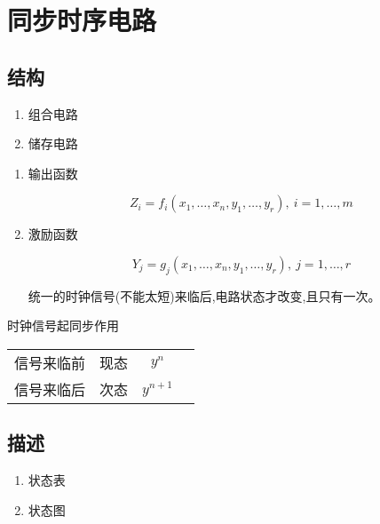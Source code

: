 \chapter{同步时序电路}
\newpage

\section{结构}

\begin{enumerate}

    \item 组合电路
    \item 储存电路

\end{enumerate}

\begin{enumerate}

\item 输出函数

\begin{equation}
    Z_i=f_i(x_1,\dots,x_n,y_1,\dots,y_r),~i=1,\dots,m
\end{equation}

\item 激励函数

\begin{equation}
    Y_j=g_j(x_1,\dots,x_n,y_1,\dots,y_r),~j=1,\dots,r
\end{equation}

统一的时钟信号(不能太短)来临后,电路状态才改变,且只有一次。

\end{enumerate}

\newpage

时钟信号起同步作用

\begin{table}[!htbp]
    \centering
    \begin{tabular}{lc|c|c}
        \toprule
        信号来临前 & 现态 & $y^{n}$   \\
        信号来临后 & 次态 & $y^{n+1}$ \\
        \bottomrule
    \end{tabular}
\end{table}

\section{描述}

\begin{enumerate}
    \item 状态表
    \item 状态图
\end{enumerate}

